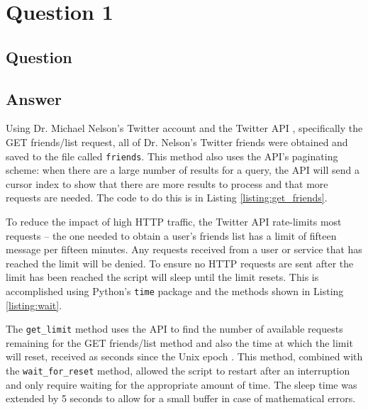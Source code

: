 \section{Question 1}

\subsection{Question}


\subsection{Answer}
Using Dr. Michael Nelson's Twitter account and the Twitter API \cite{api:twitter}, specifically the GET friends/list \cite{api:twitter_friendslist} request, all of Dr. Nelson's Twitter friends were obtained and saved to the file called {\tt friends}. This method also uses the API's paginating scheme: when there are a large number of results for a query, the API will send a cursor index to show that there are more results to process and that more requests are needed. The code to do this is in Listing \ref{listing:get_friends}. 

% 

\clearpage

To reduce the impact of high HTTP traffic, the Twitter API rate-limits most requests -- the one needed to obtain a user's friends list has a limit of fifteen message per fifteen minutes. Any requests received from a user or service that has reached the limit will be denied. To ensure no HTTP requests are sent after the limit has been reached the script will sleep until the limit resets. This is accomplished using Python's {\tt time} package \cite{py:time} and the methods shown in Listing \ref{listing:wait}.

% 

The {\tt get\_limit} method uses the API to find the number of available requests remaining for the GET friends/list method and also the time at which the limit will reset, received as seconds since the Unix epoch \cite{misc:stack_unixepoch}. This method, combined with the {\tt wait\_for\_reset} method, allowed the script to restart after an interruption and only require waiting for the appropriate amount of time. The sleep time was extended by 5 seconds to allow for a small buffer in case of mathematical errors.\\

